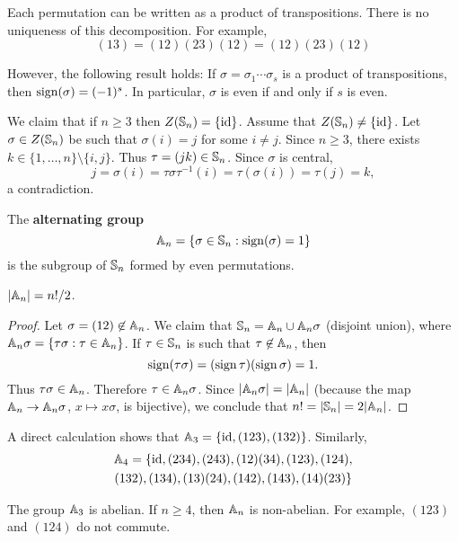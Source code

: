 Each permutation can be written as a product of transpositions. 
There is no uniqueness of this decomposition. For example, 
\[
(13)=(12)(23)(12)=(12)(23)(12)
\]

However, the following result holds: If 
$\sigma=\sigma_1\cdots\sigma_s$ is a product of transpositions, 
then $\operatorname{sign}(\sigma)=(-1)^s$.
In particular, $\sigma$ is even if and only if
$s$ is even. 


\begin{example}
We claim that if $n\geq3$ then $Z(\mathbb{S}_n)=\{\operatorname{id}\}$.
Assume that $Z(\mathbb{S}_n)\ne\{\operatorname{id}\}$. Let 
$\sigma\in Z(\mathbb{S}_n)$ be such that $\sigma(i)=j$ for some $i\ne j$. Since $n\geq3$, there exists $k\in\{1,\dots,n
\}\setminus\{i,j\}$. Thus 
$\tau=(jk)\in\mathbb{S}_n$. Since $\sigma$ is central, 
\[
j=\sigma(i)=\tau\sigma\tau^{-1}(i)=\tau(\sigma(i))=\tau(j)=k,
\]
a contradiction.
\end{example}

The \textbf{alternating group}
\[
\mathbb{A}_n=\{\sigma\in\mathbb{S}_n:\operatorname{sign}(\sigma)=1\}
\]
is the subgroup of $\mathbb{S}_n$ formed by even permutations. 

\begin{proposition}
$|\mathbb{A}_n|=n!/2$.
\end{proposition}

\begin{proof}
Let $\sigma=(12)\not\in\mathbb{A}_n$. We claim that 
$\mathbb{S}_n=\mathbb{A}_n\cup\mathbb{A}_n\sigma$ (disjoint union), where 
$\mathbb{A}_n\sigma=\{\tau\sigma:\tau\in\mathbb{A}_n\}$. If 
$\tau\in\mathbb{S}_n$ is such that $\tau\not\in\mathbb{A}_n$, then 
\[
\operatorname{sign}(\tau\sigma)=(\operatorname{sign}\tau)(\operatorname{sign}\sigma)=1.
\]
Thus 
$\tau\sigma\in\mathbb{A}_n$. Therefore $\tau\in\mathbb{A}_n\sigma$. Since  $|\mathbb{A}_n\sigma|=|\mathbb{A}_
n|$ (because the map $\mathbb{A}_n\to\mathbb{A}_n\sigma$, $x\mapsto x\sigma$, is bijective), we conclude that 
$n!=|\mathbb{S}_n|=2|\mathbb{A}_n|$.
\end{proof}

\begin{example}
A direct calculation shows that  $\mathbb{A}_3=\{\operatorname{id},(123),(132)\}$. Similarly, 
\begin{multline*}
\mathbb{A}_4=\{\operatorname{id},(234),(243),(12)(34),(123),(124),\\(132),(134),(13)(24),(142),(143),(14)(23)\}
\end{multline*}
\end{example}

The group $\mathbb{A}_3$ is abelian.
If $n\geq4$, then $\mathbb{A}_n$ is non-abelian. For example, 
$(123)$ and $(124)$ do not commute. 

